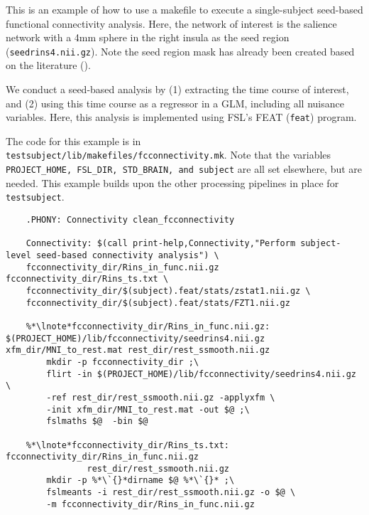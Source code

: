 \label{example:fcconnectivity}
This is an example of how to use a makefile to execute a
single-subject seed-based functional connectivity analysis. Here, the network of interest is the salience network with a 4mm sphere in the right insula as the seed region (\texttt{seedrins4.nii.gz}). Note the seed region mask has already been created based on the literature (\cite{seeley2008,lee2014}).

We conduct a seed-based analysis by (1) extracting the time course of
interest, and (2) using this time course as a regressor in a GLM,
including all nuisance variables. Here, this analysis is implemented
using FSL's FEAT (\texttt{feat}) program.


The code for this example is in \texttt{testsubject/lib/makefiles/fcconnectivity.mk}.
Note that the variables \texttt{PROJECT_HOME, FSL_DIR, STD_BRAIN, and subject} are all set elsewhere, but are needed.  This example builds upon the other processing pipelines in place for \texttt{testsubject}.

\begin{lstlisting}
	.PHONY: Connectivity clean_fcconnectivity

	Connectivity: $(call print-help,Connectivity,"Perform subject-level seed-based connectivity analysis") \
	fcconnectivity_dir/Rins_in_func.nii.gz fcconnectivity_dir/Rins_ts.txt \
	fcconnectivity_dir/$(subject).feat/stats/zstat1.nii.gz \
	fcconnectivity_dir/$(subject).feat/stats/FZT1.nii.gz

	%*\lnote*fcconnectivity_dir/Rins_in_func.nii.gz: $(PROJECT_HOME)/lib/fcconnectivity/seedrins4.nii.gz xfm_dir/MNI_to_rest.mat rest_dir/rest_ssmooth.nii.gz
		mkdir -p fcconnectivity_dir ;\
		flirt -in $(PROJECT_HOME)/lib/fcconnectivity/seedrins4.nii.gz \
		-ref rest_dir/rest_ssmooth.nii.gz -applyxfm \
		-init xfm_dir/MNI_to_rest.mat -out $@ ;\
		fslmaths $@  -bin $@ 
	
	%*\lnote*fcconnectivity_dir/Rins_ts.txt: fcconnectivity_dir/Rins_in_func.nii.gz 
				rest_dir/rest_ssmooth.nii.gz
		mkdir -p %*\`{}*dirname $@ %*\`{}* ;\
		fslmeants -i rest_dir/rest_ssmooth.nii.gz -o $@ \
		-m fcconnectivity_dir/Rins_in_func.nii.gz

\end{lstlisting}

